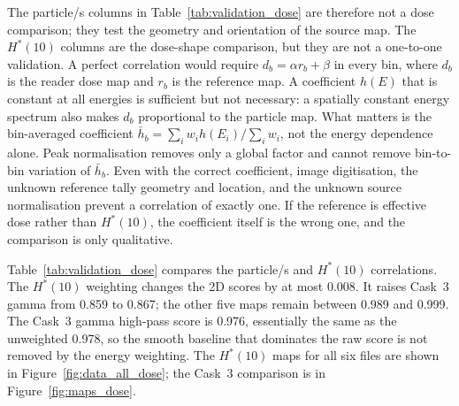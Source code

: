 \documentclass[11pt,a4paper]{article}
\begin{document}
The particle/s columns in Table~\ref{tab:validation_dose} are therefore not a
dose comparison; they test the geometry and orientation of the source map.  The
$H^*(10)$ columns are the dose-shape comparison, but they are not a one-to-one
validation.  A perfect correlation would require
\(d_b=\alpha r_b+\beta\) in every bin, where \(d_b\) is the reader dose map and
\(r_b\) is the reference map.  A coefficient \(h(E)\) that is constant at all
energies is sufficient but not necessary: a spatially constant energy spectrum
also makes \(d_b\) proportional to the particle map.  What matters is the
bin-averaged coefficient
\(\bar h_b=\sum_i w_i h(E_i)/\sum_i w_i\), not the energy dependence alone.
Peak normalisation removes only a global factor and cannot remove bin-to-bin
variation of \(\bar h_b\).  Even with the correct coefficient, image
digitisation, the unknown reference tally geometry and location, and the
unknown source normalisation prevent a correlation of exactly one.  If the
reference is effective dose rather than \(H^*(10)\), the coefficient itself is
the wrong one, and the comparison is only qualitative.

Table~\ref{tab:validation_dose} compares the particle/s and $H^*(10)$
correlations.  The $H^*(10)$ weighting changes the 2D scores by at most 0.008.
It raises Cask~3 gamma from 0.859 to 0.867; the other five maps remain between
0.989 and 0.999.  The Cask~3 gamma high-pass score is 0.976, essentially the
same as the unweighted 0.978, so the smooth baseline that dominates the raw
score is not removed by the energy weighting.  The $H^*(10)$ maps for all six
files are shown in Figure~\ref{fig:data_all_dose}; the Cask~3 comparison is in
Figure~\ref{fig:maps_dose}.
\end{document}
